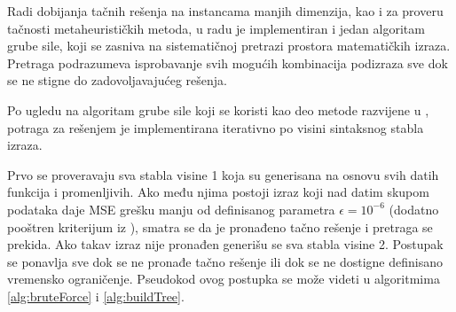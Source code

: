 \documentclass[main.tex]{subfiles}
\begin{document}

Radi dobijanja tačnih rešenja na instancama  manjih dimenzija, kao i za proveru tačnosti metaheurističkih metoda, u radu je implementiran i jedan algoritam grube sile, koji se zasniva na sistematičnoj pretrazi prostora matematičkih izraza. Pretraga podrazumeva isprobavanje svih mogućih kombinacija podizraza sve dok se ne stigne do zadovoljavajućeg rešenja.

Po ugledu na algoritam grube sile koji se koristi kao deo metode razvijene u \cite{AIFeynman}, potraga za rešenjem je implementirana iterativno po visini sintaksnog stabla izraza. 

Prvo se proveravaju sva stabla visine 1 koja su generisana na osnovu svih datih funkcija i promenljivih. Ako među njima postoji izraz koji nad datim skupom podataka daje MSE grešku manju od definisanog parametra $\epsilon = 10^{-6}$ (dodatno pooštren kriterijum iz \cite{AIFeynman}), smatra se da je pronađeno tačno rešenje i pretraga se prekida. Ako takav izraz nije pronađen generišu se sva stabla visine 2. Postupak se ponavlja sve dok se ne pronađe tačno rešenje ili dok se ne dostigne definisano vremensko ograničenje. Pseudokod ovog postupka se može videti u algoritmima \autoref{alg:bruteForce} i \autoref{alg:buildTree}.

\\
\\
\end{document}
